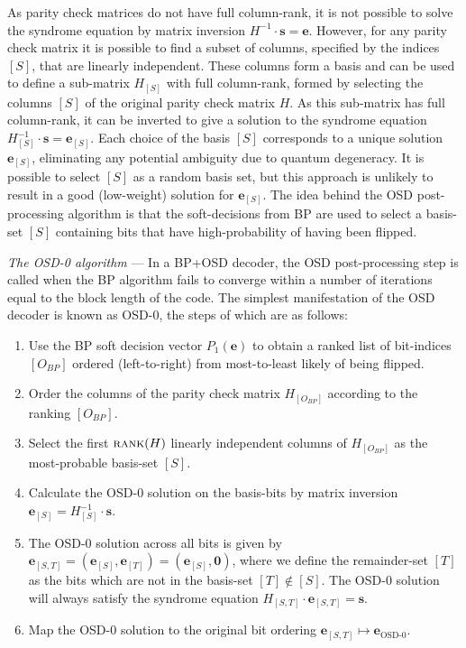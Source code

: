 \documentclass[%
 reprint,
superscriptaddress,
nofootinbib,
 amsmath,amssymb,
secnumarabic
]{revtex4-1}
\begin{document}
As parity check matrices do not have full column-rank, it is not possible to solve the syndrome equation by matrix inversion $H^{-1}\cdot \mathbf{s}= \mathbf{e}$. However, for any parity check matrix it is possible to find a subset of columns, specified by the indices $[S]$, that are linearly independent. These columns form a basis and can be used to define a sub-matrix $H_{[S]}$ with full column-rank, formed by selecting the columns $[S]$ of the original parity check matrix $H$. As this sub-matrix has full column-rank, it can be inverted to give a solution to the syndrome equation $H_{[S]}^{-1}\cdot \mathbf{s} = \mathbf{e}_{[S]}$. Each choice of the basis $[S]$ corresponds to a unique solution $\mathbf{e}_{[S]}$, eliminating any potential ambiguity due to quantum degeneracy. It is possible to select $[S]$ as a random basis set, but this approach is unlikely to result in a good (low-weight) solution for $\mathbf{e}_{[S]}$. The idea behind the OSD post-processing algorithm is that the soft-decisions from BP are used to select a basis-set $[S]$ containing bits that have high-probability of having been flipped.

\textit{The OSD-0 algorithm} --- In a BP+OSD decoder, the OSD post-processing step is called when the BP algorithm fails to converge within a number of iterations equal to the block length of the code. The simplest manifestation of the OSD decoder is known as OSD-0, the steps of which are as follows:
%
\begin{enumerate}
	\item Use the BP soft decision vector $P_1(\mathbf{e})$ to obtain a ranked list of bit-indices $[O_{BP}]$ ordered (left-to-right) from most-to-least likely of being flipped.
	\item Order the columns of the parity check matrix $H_{[O_{BP}]}$ according to the ranking $[O_{BP}]$.
	\item Select the first $\text{\sc rank}{(H)}$ linearly independent columns of $H_{[O_{BP}]}$ as the most-probable basis-set $[S]$.
	\item Calculate the OSD-0 solution on the basis-bits by matrix inversion $\mathbf{e}_{[S]}=H_{[S]}^{-1}\cdot \mathbf{s}$.
	\item The OSD-0 solution across all bits is given by $\mathbf{e}_{[S,T]} = \left(\mathbf{e}_{[S]},\mathbf{e}_{[T]}\right)=\left(\mathbf{e}_{[S]},\mathbf{0}\right)$, where we define the remainder-set $[T]$ as the bits which are not in the basis-set $[T]\notin[S]$. The OSD-0 solution will always satisfy the syndrome equation $H_{[S,T]}\cdot \mathbf{e}_{[S,T]} = \mathbf{s}$.
	\item Map the OSD-0 solution to the original bit ordering $\mathbf{e}_{[S,T]}\mapsto \mathbf{e}_{\text{OSD-0}}$.
	
\end{enumerate}
\end{document}
